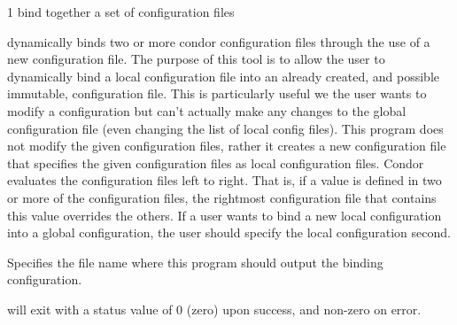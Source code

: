 \begin{ManPage}{\label{man-condor-config-bind}}{1}
{bind together a set of configuration files}

\Synopsis {}


\Description

 dynamically binds two or more condor
configuration files through the use of a new configuration file.  The
purpose of this tool is to allow the user to dynamically bind a local
configuration file into an already created, and possible immutable,
configuration file.  This is particularly useful we the user wants to
modify a configuration but can't actually make any changes to the
global configuration file (even changing the list of local config
files).  This program does not modify the given configuration files,
rather it creates a new configuration file that specifies the given
configuration files as local configuration files.  Condor evaluates
the configuration files left to right.  That is, if a value is defined
in two or more of the configuration files, the rightmost configuration
file that contains this value overrides the others.  If a user wants to
bind a new local configuration into a global configuration, the user
should specify the local configuration second.

\begin{Options}
   {
    Specifies the file name where this program should output the
    binding configuration. 
  }
\end{Options}

\ExitStatus

 will exit with a status value of 0 (zero) upon
success, and non-zero on error.

\end{ManPage}
